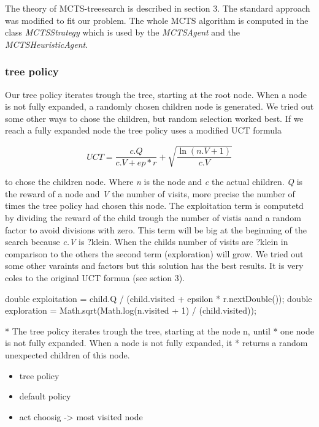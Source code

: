 The theory of MCTS-treesearch is described in section 3. The standard approach was modified to fit our problem. The whole MCTS algorithm is computed in the class \textit{MCTSStrategy} which is used by the \textit{MCTSAgent} and the \textit{MCTSHeuristicAgent}.

\subsubsection{tree policy}
Our tree policy iterates trough the tree, starting at the root node. When a node is not fully expanded, a randomly chosen children node is generated. We tried out some other ways to chose the children, but random selection worked best. If we reach a fully expanded node the tree policy uses a modified UCT formula

\begin{equation}
 	UCT = \frac{c.Q}{c.V + ep * r} + \sqrt{\frac{\ln (n.V+1)}{c.V}}
\end{equation} 

to chose the children node. Where \textit{n} is the node and \textit{c} the actual children. \textit{Q} is the reward of a node and \textit{V} the number of visits, more precise the number of times the tree policy had chosen this node. The exploitation term is computetd by dividing the reward of the child trough the number of vistis aand a random factor to avoid divisions with zero. This term will be big at the beginning of the search because \textit{c.V} is ?klein.
When the childs number of visits are ?klein in comparison to the others the second term (exploration) will grow. We tried out some other varaints and factors but this solution has the best results. It is very coles to the original UCT formua (see sction 3).   

			double exploitation = child.Q
					/ (child.visited + epsilon * r.nextDouble());
			double exploration = Math.sqrt(Math.log(n.visited + 1)
					/ (child.visited));

	 * The tree policy iterates trough the tree, starting at the node n, until
	 * one node is not fully expanded. When a node is not fully expanded, it
	 * returns a random unexpected children of this node.

\begin{itemize}
  \item tree policy
  \item default policy
  \item act choosig -> most visited node
\end{itemize}
























